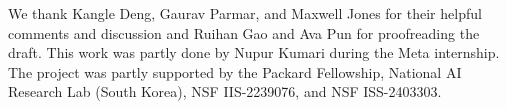 We thank Kangle Deng, Gaurav Parmar, and Maxwell Jones for their helpful comments and discussion and Ruihan Gao and Ava Pun for proofreading the draft. This work was partly done by Nupur Kumari during the Meta internship. The project was partly supported by the Packard
Fellowship, National AI Research Lab (South Korea), NSF
IIS-2239076, and NSF ISS-2403303.

